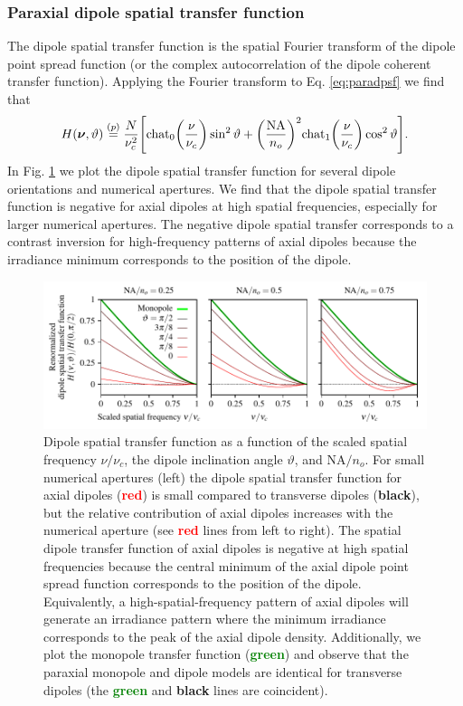 \documentclass[]{osa-article}
\let\originalleft\left
\let\originalright\right
\renewcommand{\left}{\mathopen{}\mathclose\bgroup\originalleft}
\renewcommand{\right}{\aftergroup\egroup\originalright}
\providecommand{\bs}[1]{\boldsymbol{#1}}
\begin{document}
\subsubsection{Paraxial dipole spatial transfer function}\label{sec:trans}
The dipole spatial transfer function is the spatial Fourier transform of
the dipole point spread function (or the complex autocorrelation of the dipole
coherent transfer function). Applying the Fourier transform to Eq.
\eqref{eq:paradpsf} we find that
  \begin{align}
    H(\bs{\nu}, \vartheta) \stackrel{(p)}{=} \frac{N}{\nu_c^2}\left[\text{chat}_0\left(\frac{\nu}{\nu_c}\right)\sin^2\vartheta + \left(\frac{\text{NA}}{n_o}\right)^2 \text{chat}_1\left(\frac{\nu}{\nu_c}\right)\cos^2\vartheta\right].
  \end{align}
In Fig. \ref{fig:odotf} we plot the dipole spatial transfer function for
several dipole orientations and numerical apertures. We find that the dipole
spatial transfer function is negative for axial dipoles at high spatial
frequencies, especially for larger numerical apertures. The negative dipole
spatial transfer corresponds to a contrast inversion for high-frequency
patterns of axial dipoles because the irradiance minimum corresponds to the
position of the dipole.

\begin{figure}[h]
 \centering
   \centering
   \includegraphics[scale=0.8]{../figures/paratfs/sdtf.pdf}
   \caption{Dipole spatial transfer function as a function of the scaled spatial
     frequency $\nu/\nu_c$, the dipole inclination angle $\vartheta$, and
     $\text{NA}/n_o$. For small numerical apertures (left) the dipole spatial
     transfer function for axial dipoles (\textcolor{red}{\textbf{red}}) is
     small compared to transverse dipoles (\textbf{black}), but the relative
     contribution of axial dipoles increases with the numerical aperture (see
     \textcolor{red}{\textbf{red}} lines from left to right). The spatial dipole
     transfer function of axial dipoles is negative at high spatial frequencies
     because the central minimum of the axial dipole point spread function
     corresponds to the position of the dipole. Equivalently, a
     high-spatial-frequency pattern of axial dipoles will generate an irradiance
     pattern where the minimum irradiance corresponds to the peak of the axial
     dipole density. Additionally, we plot the monopole transfer function
     (\textcolor{green}{\textbf{green}}) and observe that the paraxial monopole
     and dipole models are identical for transverse dipoles (the
     \textcolor{green}{\textbf{green}} and \textbf{black} lines are
     coincident).}
   \label{fig:odotf}
 \end{figure}
\end{document}
